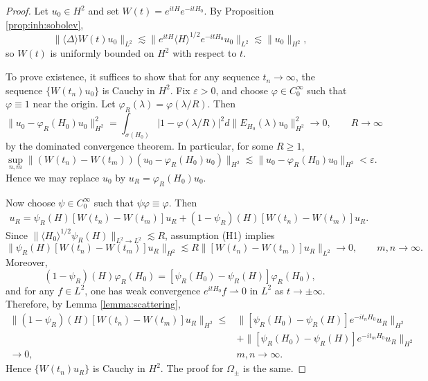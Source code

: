 \documentclass[11pt,a4paper]{article}
\numberwithin{equation}{section}
\begin{document}
\begin{proof}
Let $u_{0} \in H^{2}$ and set $W(t) = e^{itH}e^{-itH_{0}}$. By Proposition \ref{prop:inh:sobolev},
\[
\|\langle \Delta \rangle W(t)u_{0} \|_{L^{2}} \lesssim \|e^{itH}\langle H \rangle^{1/2} e^{-itH_{0}} u_{0}\|_{L^{2}} \lesssim \|u_{0}\|_{H^{2}},
\]
so $W(t)$ is uniformly bounded on $H^{2}$ with respect to $t$.

To prove existence, it suffices to show that for any sequence $t_{n} \to \infty$, the sequence $\{W(t_{n})u_{0}\}$ is Cauchy in $H^{2}$.
Fix $\varepsilon > 0$, and choose $\varphi \in C^{\infty}_{0}$ such that $\varphi \equiv 1$ near the origin. Let $\varphi_{R}(\lambda) = \varphi(\lambda / R)$. Then
\[
\|u_{0} - \varphi_{R}(H_{0})u_{0}\|_{H^{2}}^{2}
= \int_{\sigma(H_{0})} |1 - \varphi(\lambda / R)|^{2} d\|E_{H_{0}}(\lambda)u_{0}\|^{2}_{H^{2}} \rightarrow 0,\qquad R \rightarrow \infty
\]
by the dominated convergence theorem.
In particular, for some $R \geq 1$,
\[
\sup_{n, m}\|(W(t_{n}) - W(t_{m}))(u_{0} - \varphi_{R}(H_{0})u_{0})\|_{H^{2}}
\lesssim \|u_{0} - \varphi_{R}(H_{0})u_{0}\|_{H^{2}} < \varepsilon.
\]
Hence we may replace $u_{0}$ by $u_{R} = \varphi_{R}(H_{0})u_{0}$.

Now choose $\psi \in C^{\infty}_{0}$ such that $\psi\varphi \equiv \varphi$. Then
\begin{align*}
[W(t_{n}) - W(t_{m})]u_{R}
= \psi_{R}(H)[W(t_{n}) - W(t_{m})]u_{R} + (1 - \psi_{R})(H)[W(t_{n}) - W(t_{m})]u_{R}.
\end{align*}
Since $\|\langle H_{0} \rangle^{1/2} \psi_{R}(H)\|_{L^{2} \rightarrow L^{2}} \lesssim R$, assumption (H1) implies
\[
\|\psi_{R}(H)[W(t_{n}) - W(t_{m})]u_{R}\|_{H^{2}}
\lesssim R\|[W(t_{n}) - W(t_{m})]u_{R}\|_{L^{2}} \rightarrow 0, \qquad m,n \rightarrow \infty.
\]
Moreover,
\[
(1 - \psi_{R})(H)\varphi_{R}(H_{0}) = [ \psi_{R}(H_{0}) - \psi_{R}(H) ]\varphi_{R}(H_{0}),
\]
and for any $f \in L^{2}$, one has weak convergence $e^{itH_{0}}f \rightharpoonup 0$ in $L^{2}$ as $t \to \pm \infty$. Therefore, by Lemma \ref{lemma:scattering},
\begin{align*}
\|(1 - \psi_{R})(H)[W(t_{n}) - W(t_{m})]u_{R}\|_{H^{2}}
\leq &\|[\psi_{R}(H_{0}) - \psi_{R}(H)]e^{-it_{n}H_{0}}u_{R}\|_{H^{2}} \\
&+ \|[\psi_{R}(H_{0}) - \psi_{R}(H)]e^{-it_{m}H_{0}}u_{R}\|_{H^{2}} \\
\rightarrow 0, \qquad &m,n \rightarrow \infty.
\end{align*}
Hence $\{W(t_{n})u_{R}\}$ is Cauchy in $H^{2}$.
The proof for $\Omega_{\pm}$ is the same.
\end{proof}
\end{document}
